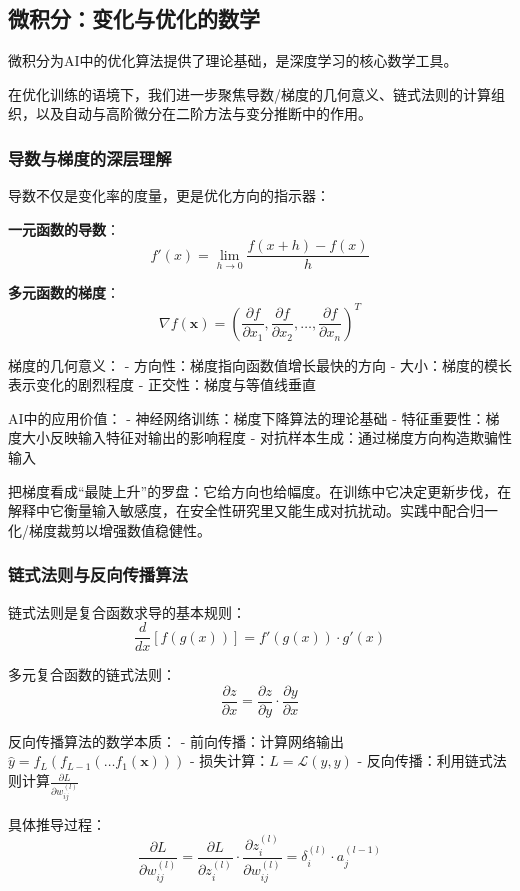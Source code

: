 \subsection{微积分：变化与优化的数学}

微积分为AI中的优化算法提供了理论基础，是深度学习的核心数学工具。

在优化训练的语境下，我们进一步聚焦导数/梯度的几何意义、链式法则的计算组织，以及自动与高阶微分在二阶方法与变分推断中的作用。

\subsubsection{导数与梯度的深层理解}

导数不仅是变化率的度量，更是优化方向的指示器：

\textbf{一元函数的导数}：
$$f'(x) = \lim_{h \to 0} \frac{f(x+h) - f(x)}{h}$$

\textbf{多元函数的梯度}：
$$\nabla f(\mathbf{x}) = \left(\frac{\partial f}{\partial x_1}, \frac{\partial f}{\partial x_2}, \ldots, \frac{\partial f}{\partial x_n}\right)^T$$

梯度的几何意义：
- 方向性：梯度指向函数值增长最快的方向
- 大小：梯度的模长表示变化的剧烈程度
- 正交性：梯度与等值线垂直

AI中的应用价值：
- 神经网络训练：梯度下降算法的理论基础
- 特征重要性：梯度大小反映输入特征对输出的影响程度
- 对抗样本生成：通过梯度方向构造欺骗性输入

把梯度看成“最陡上升”的罗盘：它给方向也给幅度。在训练中它决定更新步伐，在解释中它衡量输入敏感度，在安全性研究里又能生成对抗扰动。实践中配合归一化/梯度裁剪以增强数值稳健性。

\subsubsection{链式法则与反向传播算法}

链式法则是复合函数求导的基本规则：
$$\frac{d}{dx}[f(g(x))] = f'(g(x)) \cdot g'(x)$$

多元复合函数的链式法则：
$$\frac{\partial z}{\partial x} = \frac{\partial z}{\partial y} \cdot \frac{\partial y}{\partial x}$$

反向传播算法的数学本质：
- 前向传播：计算网络输出$\hat{y} = f_L(f_{L-1}(\ldots f_1(\mathbf{x})))$
- 损失计算：$L = \mathcal{L}(\hat{y}, y)$
- 反向传播：利用链式法则计算$\frac{\partial L}{\partial w_{ij}^{(l)}}$

具体推导过程：
$$\frac{\partial L}{\partial w_{ij}^{(l)}} = \frac{\partial L}{\partial z_i^{(l)}} \cdot \frac{\partial z_i^{(l)}}{\partial w_{ij}^{(l)}} = \delta_i^{(l)} \cdot a_j^{(l-1)}$$

